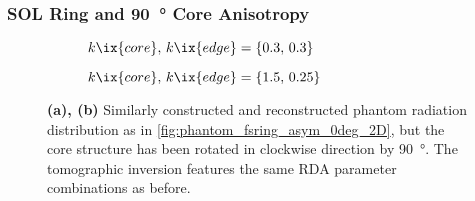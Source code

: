            \subsubsection*{SOL Ring and \SI{90}{\degree} Core Anisotropy}%
%
                \begin{figure}[t]%
                    \centering%
                    \begin{subfigure}{\textwidth}%
                        \centering%
                        \caption{$k\ix{core},\,k\ix{edge}=\left\{0.3,\,0.3\right\}$}%
                    \end{subfigure}%
                    \newline%
                    \begin{subfigure}{\textwidth}%
                        \centering%
                        \caption{$k\ix{core},\,k\ix{edge}=\left\{1.5,\,0.25\right\}$}%
                    \end{subfigure}%
                    \caption{\textbf{(a), (b)} Similarly constructed and reconstructed phantom radiation distribution as in \cref{fig:phantom_fsring_asym_0deg_2D}, but the core structure has been rotated in clockwise direction by \SI{90}{\degree}. The tomographic inversion features the same RDA parameter combinations as before.}\label{fig:phantom_fsring_asym_90deg_2D}%
                \end{figure}%
%
